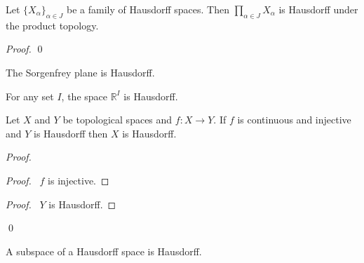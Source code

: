 \begin{thm}
  \label{thm:topology:Hausdorff:product}
  Let $\{ X_\alpha \}_{\alpha \in J}$ be a family of Hausdorff spaces. Then
  $\prod_{\alpha \in J} X_\alpha$ is Hausdorff under the product topology.
\end{thm}

\begin{proof}
  \pf
  \qed
\end{proof}

\begin{cor}
 The Sorgenfrey plane is Hausdorff.
\end{cor}

\begin{cor}
  For any set $I$,
  the space $\mathbb{R}^I$ is Hausdorff.
\end{cor}

\begin{prop}
  Let $X$ and $Y$ be topological spaces and $f : X \rightarrow Y$. If $f$ is
  continuous and injective and $Y$ is Hausdorff then $X$ is Hausdorff.
\end{prop}

\begin{proof}
  \pf
  \begin{proof}
    \pf\ $f$ is injective.
  \end{proof}
  \begin{proof}
    \pf\ $Y$ is Hausdorff.
  \end{proof}
  \qed
\end{proof}

\begin{cor}
  \label{cor:topology:Hausdorff:subspace}
  A subspace of a Hausdorff space is Hausdorff.
\end{cor}

